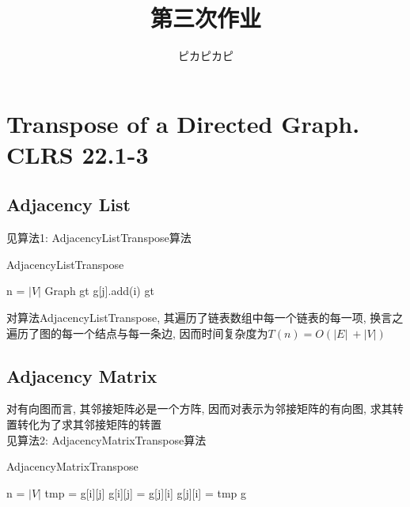 \documentclass{article}
\begin{document}
 
 
 
\title{第三次作业}
\author{ピカピカピ}
 
\maketitle

\section{Transpose of a Directed Graph. CLRS 22.1-3}
\subsection{Adjacency List}
见算法1: AdjacencyListTranspose算法

\begin{algorithm}
\caption{AdjacencyListTranspose}
\begin{algorithmic}[1]
\State n = $|V|$
\State Graph gt 
 
\State g[j].add(i) 
\EndFor
\EndFor
\State \Return gt
\EndProcedure
\end{algorithmic}
\end{algorithm}

对算法AdjacencyListTranspose, 其遍历了链表数组中每一个链表的每一项, 换言之遍历了图的每一个结点与每一条边, 因而时间复杂度为$T(n) = O(|E|\ + |V|)$

\subsection{Adjacency Matrix}
对有向图而言, 其邻接矩阵必是一个方阵, 因而对表示为邻接矩阵的有向图, 求其转置转化为了求其邻接矩阵的转置 \\
见算法2: AdjacencyMatrixTranspose算法

\begin{algorithm}
\caption{AdjacencyMatrixTranspose}
\begin{algorithmic}[1]
\State n = $|V|$
\State tmp = g[i][j]
\State g[i][j] = g[j][i]
\State g[j][i] = tmp 
\EndFor
\EndFor
\State \Return g
\EndProcedure
\end{algorithmic}
\end{algorithm}
\end{document}
